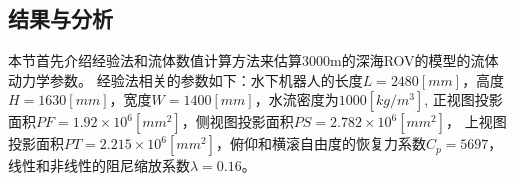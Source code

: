 \begin{figure}
\label{fig:chap4:F6}
\centering
{}
\end{figure}


\subsection{结果与分析 }

本节首先介绍经验法和流体数值计算方法来估算3000m的深海ROV的模型的流体动力学参数。
经验法相关的参数如下：水下机器人的长度$L=2480[mm]$，高度$H=1630[mm]$，宽度$W=1400[mm]$，水流密度为$1000[kg/m^3]$, 正视图投影面积$PF= 1.92 \times 10^6[mm^2]$，侧视图投影面积$PS= 2.782 \times 10^6[mm^2]$， 上视图投影面积$PT= 2.215\times 10^6[mm^2]$，俯仰和横滚自由度的恢复力系数$C_p = 5697$，线性和非线性的阻尼缩放系数$\lambda = 0.16$。

